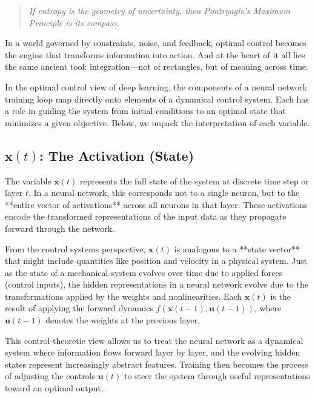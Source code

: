\begin{quote}
\emph{If entropy is the geometry of uncertainty, then Pontryagin’s Maximum Principle is its compass.}
\end{quote}

In a world governed by constraints, noise, and feedback, optimal control becomes the engine that transforms information into action. And at the heart of it all lies the same ancient tool: integration—not of rectangles, but of meaning across time.



In the optimal control view of deep learning, the components of a neural network training loop map directly onto elements of a dynamical control system. Each has a role in guiding the system from initial conditions to an optimal state that minimizes a given objective. Below, we unpack the interpretation of each variable.

\subsection{\(\mathbf{x}(t)\): The Activation (State)}

The variable \(\mathbf{x}(t)\) represents the full state of the system at discrete time step or layer \(t\). In a neural network, this corresponds not to a single neuron, but to the **entire vector of activations** across all neurons in that layer. These activations encode the transformed representations of the input data as they propagate forward through the network.

From the control systems perspective, \(\mathbf{x}(t)\) is analogous to a **state vector** that might include quantities like position and velocity in a physical system. Just as the state of a mechanical system evolves over time due to applied forces (control inputs), the hidden representations in a neural network evolve due to the transformations applied by the weights and nonlinearities. Each \(\mathbf{x}(t)\) is the result of applying the forward dynamics \(f(\mathbf{x}(t{-}1), \mathbf{u}(t{-}1))\), where \(\mathbf{u}(t{-}1)\) denotes the weights at the previous layer.

This control-theoretic view allows us to treat the neural network as a dynamical system where information flows forward layer by layer, and the evolving hidden states represent increasingly abstract features. Training then becomes the process of adjusting the controls \(\mathbf{u}(t)\) to steer the system through useful representations toward an optimal output.

